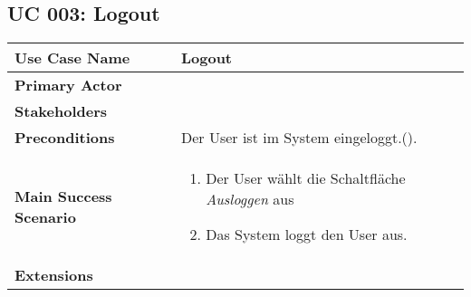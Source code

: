 \subsection{UC 003: Logout}
\label{uc:003-logout}

\begin{tabular}{|l|p{}|}
\hline
\textbf{Use Case Name} 	&	Logout	\\ \hline
\textbf{Primary Actor} 	&		\\ \hline
\textbf{Stakeholders}	&		\\ \hline
\textbf{Preconditions}	&	Der User ist im System eingeloggt.(\nameref{uc:002-login}).	\\ \hline
\textbf{Main Success Scenario}	& 	
\begin{enumerate}
	\item Der User wählt die Schaltfläche \emph{Ausloggen} aus
	\item Das System loggt den User aus.
\end{enumerate}
\\ \hline
\textbf{Extensions}	& 	\\ \hline
\end{tabular}